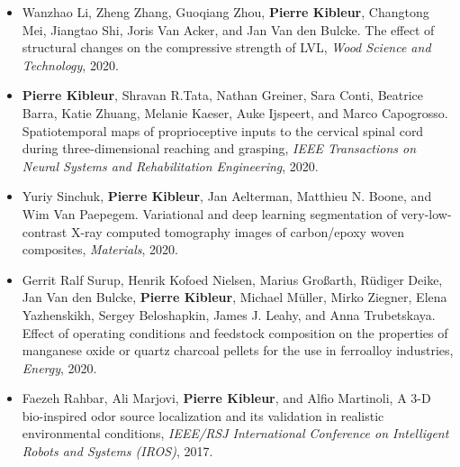 \documentclass[oneside, english, 10pt, a4paper]{memoir}
\begin{document}
\begin{itemize}
	\item {Wanzhao Li, Zheng Zhang, Guoqiang Zhou, \textbf{Pierre Kibleur}, Changtong Mei, Jiangtao Shi, Joris Van Acker, and Jan Van den Bulcke}. {The effect of structural changes on the compressive strength of LVL}, \emph{Wood Science and Technology}, 2020.     
	
	\item {\textbf{Pierre Kibleur}, Shravan R.Tata, Nathan Greiner, Sara Conti, Beatrice Barra, Katie Zhuang, Melanie Kaeser, Auke Ijspeert, and Marco Capogrosso}. {Spatiotemporal maps of proprioceptive inputs to the cervical spinal cord during three-dimensional reaching and grasping}, \emph{IEEE Transactions on Neural Systems and Rehabilitation Engineering}, 2020.
	
	\item {Yuriy Sinchuk, \textbf{Pierre Kibleur}, Jan Aelterman, Matthieu N. Boone, and Wim Van Paepegem}. {Variational and deep learning segmentation of very-low-contrast X-ray computed tomography images of carbon/epoxy woven composites}, \emph{Materials}, 2020.   
	
	\item {Gerrit Ralf Surup, Henrik Kofoed Nielsen, Marius Gro{\ss}arth, R{\"{u}}diger Deike, Jan Van den Bulcke, \textbf{Pierre Kibleur}, Michael M{\"{u}}ller, Mirko Ziegner, Elena Yazhenskikh, Sergey Beloshapkin, James J. Leahy, and Anna Trubetskaya}. {Effect of operating conditions and feedstock composition on the properties of manganese oxide or quartz charcoal pellets for the use in ferroalloy industries}, \emph{Energy}, 2020.
	
	\item {Faezeh Rahbar, Ali Marjovi, \textbf{Pierre Kibleur}, and Alfio Martinoli, A 3-D bio-inspired odor source localization and its validation in realistic environmental conditions, \emph{IEEE/RSJ International Conference on Intelligent Robots and Systems (IROS)}, 2017.}
\end{itemize}
       
\end{document}
